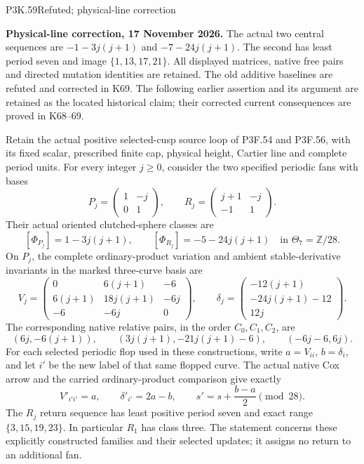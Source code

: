 \begin{statement}{P3K.59}{Refuted; physical-line correction}\par\noindent\textbf{Physical-line correction, 17 November 2026.} The actual two central sequences are \(-1-3j(j+1)\) and \(-7-24j(j+1)\). The second has least period seven and image \(\{1,13,17,21\}\). All displayed matrices, native free pairs and directed mutation identities are retained. The old additive baselines are refuted and corrected in K69. The following earlier assertion and its argument are retained as the located historical claim; their corrected current consequences are proved in K68--69.\medskip\par 
Retain the actual positive selected-cusp source loop of
P3F.54 and P3F.56, with its fixed scalar, prescribed finite cap,
physical height, Cartier line and complete period units. For every
integer \(j\geq0\), consider the two specified periodic fans with bases
\[
 P_j=\begin{pmatrix}1&-j\\0&1\end{pmatrix},\qquad
 R_j=\begin{pmatrix}j+1&-j\\-1&1\end{pmatrix}.
\]
Their actual oriented clutched-sphere classes are
\[
 [\Phi_{P_j}]=1-3j(j+1),\qquad
 [\Phi_{R_j}]=-5-24j(j+1)\quad\text{in }\Theta_7=\mathbb Z/28.
\]
On \(P_j\), the complete ordinary-product variation and ambient
stable-derivative invariants in the marked three-curve basis are
\[
 V_j=\begin{pmatrix}
 0&6(j+1)&-6\\
 6(j+1)&18j(j+1)&-6j\\
 -6&-6j&0
 \end{pmatrix},\qquad
 \delta_j=\begin{pmatrix}-12(j+1)\\-24j(j+1)-12\\12j\end{pmatrix}.
\]
The corresponding native relative pairs, in the order \(C_0,C_1,C_2\), are
\[
 (6j,-6(j+1)),\qquad
 (3j(j+1),-21j(j+1)-6),\qquad
 (-6j-6,6j).
\]
For each selected periodic flop used in these constructions, write
\(a=V_{ii}\), \(b=\delta_i\), and let \(i'\) be the new label of that
same flopped curve. The actual native Cox arrow and the carried
ordinary-product comparison give exactly
\[
 V'_{i'i'}=a,\qquad \delta'_{i'}=2a-b,\qquad
 s'=s+\frac{b-a}{2}\pmod {28}.
\]
The \(R_j\) return sequence has least positive period seven and exact
range \(\{3,15,19,23\}\). In particular \(R_1\) has class three.
The statement concerns these explicitly constructed families and their
selected updates; it assigns no return to an additional fan.
\end{statement}
